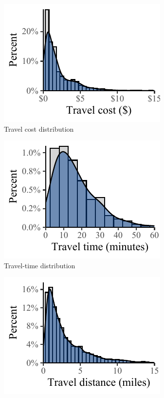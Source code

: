\documentclass[numbered]{trbunofficial}\usepackage[]{graphicx}\usepackage[]{color}
\makeatletter
\def\maxwidth{ %
  \ifdim\Gin@nat@width>\linewidth
    \linewidth
  \else
    \Gin@nat@width
  \fi
}
\newenvironment{knitrout}{}{} %
\makeatother
\begin{document}
\begin{figure}[!h]
  \centering
  \begin{subfigure}[b]{0.325\textwidth}
\begin{knitrout}
\color{fgcolor}
\includegraphics[width=\maxwidth]{figure/plot_costdist-1} 

\end{knitrout}
	  \caption{\centering Travel cost distribution}
	  \label{fig:costdist}
	\end{subfigure}
	\begin{subfigure}[b]{0.325\textwidth}
\begin{knitrout}
\color{fgcolor}
\includegraphics[width=\maxwidth]{figure/plot_timedist-1} 

\end{knitrout}
    \caption{\centering Travel-time distribution}
	  \label{fig:timedist}
  \end{subfigure}
  \begin{subfigure}[b]{0.325\textwidth}
\begin{knitrout}
\color{fgcolor}
\includegraphics[width=\maxwidth]{figure/plot_distist-1} 


\end{knitrout}
\end{subfigure}
\end{figure}
\end{document}
